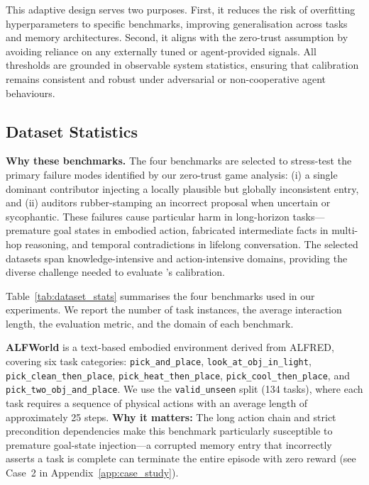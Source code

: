 This adaptive design serves two purposes.  First, it
reduces the risk of overfitting hyperparameters to
specific benchmarks, improving generalisation across
tasks and memory architectures.  Second, it aligns
with the zero-trust assumption by avoiding reliance
on any externally tuned or agent-provided signals.
All thresholds are grounded in observable system
statistics, ensuring that calibration remains
consistent and robust under adversarial or
non-cooperative agent behaviours.




\subsection{Dataset Statistics}
\label{app:datasets}

\noindent\textbf{Why these benchmarks.} The four benchmarks are
selected to stress-test the primary failure modes identified by
our zero-trust game analysis: (i) a single dominant contributor
injecting a locally plausible but globally inconsistent entry, and
(ii) auditors rubber-stamping an incorrect proposal when 
uncertain or sycophantic. These failures cause particular harm
in long-horizon tasks---premature goal states in embodied action,
fabricated intermediate facts in multi-hop reasoning, and temporal
contradictions in lifelong conversation. The selected datasets
span knowledge-intensive and action-intensive domains, providing
the diverse challenge needed to evaluate \system's calibration.

Table~\ref{tab:dataset_stats} summarises the four benchmarks
used in our experiments. We report the number of task instances,
the average interaction length, the evaluation metric, and the 
domain of each benchmark.



\textbf{ALFWorld} is a text-based embodied environment
derived from ALFRED, covering six task categories:
\texttt{pick\_and\_place}, \texttt{look\_at\_obj\_in\_light},
\texttt{pick\_clean\_then\_place},
\texttt{pick\_heat\_then\_place},
\texttt{pick\_cool\_then\_place}, and
\texttt{pick\_two\_obj\_and\_place}. We use the
\texttt{valid\_unseen} split (134 tasks), where each task
requires a sequence of physical actions with an average length of
approximately 25 steps. \textbf{Why it matters:} The long action
chain and strict precondition dependencies make this benchmark
particularly susceptible to premature goal-state injection---a
corrupted memory entry that incorrectly asserts a task is complete
can terminate the entire episode with zero reward (see Case~2 in
Appendix~\ref{app:case_study}).

